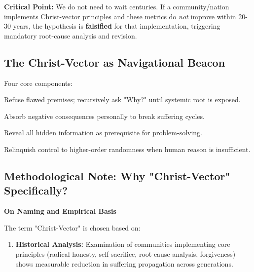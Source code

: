 \documentclass[11pt,a4paper]{article}
\theoremstyle{definition}
\theoremstyle{remark}
\begin{document}
\begin{small}
\textbf{Critical Point:} We do not need to wait centuries. If a community/nation implements Christ-vector principles and these metrics do \textit{not} improve within 20-30 years, the hypothesis is \textbf{falsified} for that implementation, triggering mandatory root-cause analysis and revision.


\subsection{The Christ-Vector as Navigational Beacon}

Four core components:

\begin{description}[style=nextline]
\item[\textbf{Root-Cause Analysis}] Refuse flawed premises; recursively ask "Why?" until systemic root is exposed.

\item[\textbf{Radical Self-Sacrifice}] Absorb negative consequences personally to break suffering cycles.

\item[\textbf{Radical Honesty}] Reveal all hidden information as prerequisite for problem-solving.

\item[\textbf{Trust in Providence}] Relinquish control to higher-order randomness when human reason is insufficient.
\end{description}


\subsection{Methodological Note: Why "Christ-Vector" Specifically?}

\begin{mdframed}[backgroundcolor=blue!5]
\textbf{On Naming and Empirical Basis}

The term "Christ-Vector" is chosen based on:

\begin{enumerate}
\item \textbf{Historical Analysis:} Examination of communities implementing core principles (radical honesty, self-sacrifice, root-cause analysis, forgiveness) shows measurable reduction in suffering propagation across generations.


\end{enumerate}
\end{mdframed}
\end{small}
\end{document}
